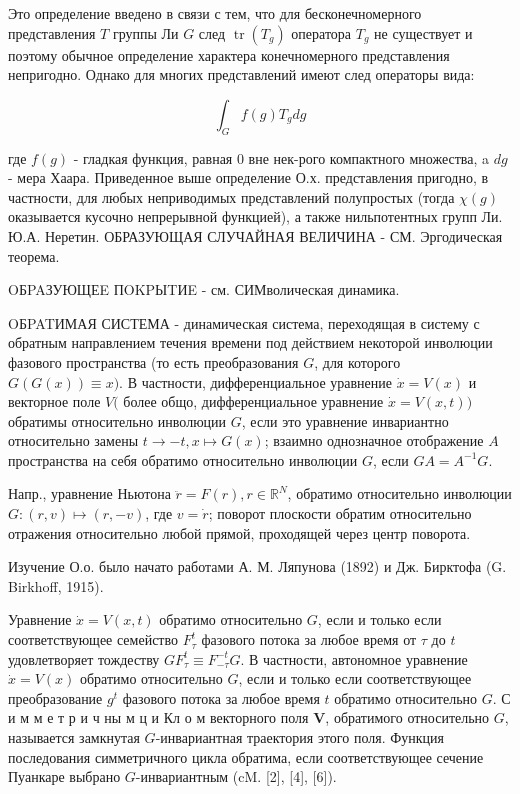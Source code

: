 \documentclass[10pt]{article}
\begin{document}
Это определение введено в связи с тем, что для бесконечномерного представления $T$ группы Ли $G$ след $\operatorname{tr}\left(T_{g}\right)$ оператора $T_{g}$ не существует и поэтому обычное определение характера конечномерного представления непригодно. Однако для многих представлений имеют след операторы вида:



\[

\int_{G} f(g) T_{g} d g

\]



где $f(g)$ - гладкая функция, равная 0 вне нек-рого компактного множества, a $d g$ - мера Хаара. Приведенное выше определение О.х. представления пригодно, в частности, для любых неприводимых представлений полупростых (тогда $\chi(g)$ оказывается кусочно непрерывной функцией), а также нильпотентных групп Ли. Ю.А. Неретин. ОБРАЗУЮЩАЯ СЛУЧАЙНАЯ ВЕЛИЧИНА - СМ. Эргодическая теорема.



OБPAЗУЮЩЕE ПOKPЫTИE - см. СИМволическая динамика.



OБPATИМАЯ СИСТЕМА - динамическая система, переходящая в систему с обратным направлением течения времени под действием некоторой инволюции фазового пространства (то есть преобразования $G$, для которого $G(G(x)) \equiv x)$. В частности, дифференциальное уравнение $\dot{x}=V(x)$ и векторное поле $V($ более общо, дифференциальное уравнение $\dot{x}=V(x, t))$ обратимы относительно инволюции $G$, если это уравнение инвариантно относительно замены $t \rightarrow-t, x \mapsto G(x)$; взаимно однозначное отображение $A$ пространства на себя обратимо относительно инволюции $G$, если $G A=A^{-1} G$.



Напр., уравнение Ньютона $\ddot{r}=F(r), r \in \mathbb{R}^{N}$, обратимо относительно инволюции $G:(r, v) \mapsto(r,-v)$, где $v=\dot{r}$; поворот плоскости обратим относительно отражения относительно любой прямой, проходящей через центр поворота.



Изучение О.о. было начато работами А. М. Ляпунова (1892) и Дж. Бирктофа (G. Birkhoff, 1915).



Уравнение $\dot{x}=V(x, t)$ обратимо относительно $G$, если и только если соответствующее семейство $F_{\tau}^{t}$ фазового потока за любое время от $\tau$ до $t$ удовлетворяет тождеству $G F_{\tau}^{t} \equiv F_{-\tau}^{-t} G$. В частности, автономное уравнение $\dot{x}=V(x)$ обратимо относительно $G$, если и только если соответствующее преобразование $g^{t}$ фазового потока за любое время $t$ обратимо относительно $G$. С и м м е т р и ч ны м ц и Кл о м векторного поля $\boldsymbol{V}$, обратимого относительно $G$, называется замкнутая $G$-инвариантная траектория этого поля. Функция последования симметричного цикла обратима, если соответствующее сечение Пуанкаре выбрано $G$-инвариантным (cM. [2], [4], [6]).
\end{document}
